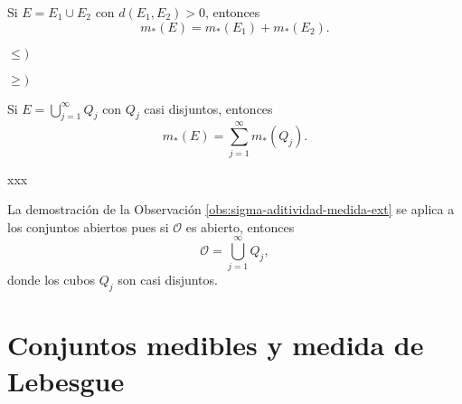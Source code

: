     \begin{observacion}{}
    Si $E=E_1\cup E_2$ con $d(E_1,E_2)>0$, entonces
    \[
    m_{*}(E)=m_{*}(E_1)+m_{*}(E_2).
    \]
    \begin{demo}
    $\leq) $
    
    $\geq)$
    \end{demo}
    \end{observacion}
    
\begin{observacion}\label{obs:sigma-aditividad-medida-ext}
Si $E=\bigcup\limits_{j=1}^{\infty} Q_j$ con $Q_j$ casi disjuntos, entonces
\[
m_{*}(E)=\sum\limits_{j=1}^{\infty} m_{*}(Q_j).\]
\begin{demo}
xxx
\end{demo}

\end{observacion}

La demostraci\'on de la Observaci\'on \ref{obs:sigma-aditividad-medida-ext} se aplica a los conjuntos abiertos pues si
$\mathcal{O}$ es abierto, entonces
\[
\mathcal{O}=\bigcup\limits_{j=1}^{\infty} Q_j,
\]
donde los cubos $Q_j$ son casi disjuntos.




\section{Conjuntos medibles y medida de Lebesgue}
